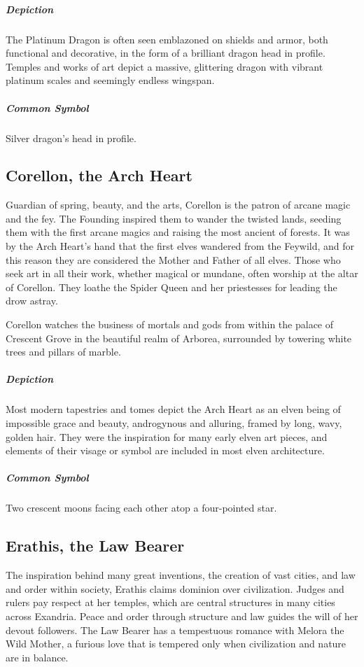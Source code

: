 \documentclass[letterpaper,twocolumn,openany,nodeprecatedcode]{dndbook}
\begin{document}
\subparagraph{Depiction}
The Platinum Dragon is often seen emblazoned on shields and armor, both functional and
decorative, in the form of a brilliant dragon head in profile. Temples and works of art
depict a massive, glittering dragon with vibrant platinum scales and seemingly
endless wingspan.

\subparagraph{Common Symbol}
Silver dragon’s head in profile.

\subsection{Corellon, the Arch Heart}

Guardian of spring, beauty, and the arts, Corellon is the patron of arcane magic and
the fey. The Founding inspired them to wander the twisted lands, seeding them with the
first arcane magics and raising the most ancient of forests. It was by the Arch Heart’s
hand that the first elves wandered from the Feywild, and for this reason they are
considered the Mother and Father of all elves. Those who seek art in all their work,
whether magical or mundane, often worship at the altar of Corellon. They loathe the
Spider Queen and her priestesses for leading the drow astray.

Corellon watches the business of mortals and gods from within the palace of Crescent
Grove in the beautiful realm of Arborea, surrounded by towering white trees and
pillars of marble.

\subparagraph{Depiction}
Most modern tapestries and tomes depict the Arch Heart as an elven being of impossible
grace and beauty, androgynous and alluring, framed by long, wavy, golden hair. They were
the inspiration for many early elven art pieces, and elements of their visage or symbol
are included in most elven architecture.

\subparagraph{Common Symbol}
Two crescent moons facing each other atop a four-pointed star.

\subsection{Erathis, the Law Bearer}

The inspiration behind many great inventions, the creation of vast cities, and law and
order within society, Erathis claims dominion over civilization. Judges and rulers pay
respect at her temples, which are central structures in many cities across Exandria.
Peace and order through structure and law guides the will of her devout followers.
The Law Bearer has a tempestuous romance with Melora the Wild Mother, a furious love
that is tempered only when civilization and nature are in balance.
\end{document}
